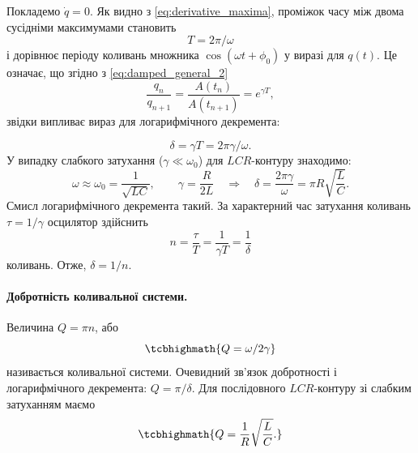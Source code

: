 Покладемо $\dot{q} = 0$. Як видно з \eqref{eq:derivative_maxima}, проміжок часу між
двома сусідніми максимумами становить
\begin{equation}\label{eq:period}
	T = 2\pi/\omega
\end{equation}
і дорівнює періоду коливань множника $\cos(\omega t + \phi_0)$ у виразі для
$q(t)$. Це означає, що згідно з \eqref{eq:damped_general_2}
\begin{equation}\label{eq:maxima_ratio}
	\frac{q_n}{q_{n+1}} = \frac{A(t_n)}{A(t_{n+1})} = e^{\gamma T},
\end{equation}
звідки випливає вираз для логарифмічного декремента:

\begin{equation}\label{eq:delta_explicit}
	\delta = \gamma T = 2\pi\gamma/\omega.
\end{equation}
У випадку слабкого затухання ($\gamma \ll \omega_0$) для $LCR$-контуру знаходимо:
\begin{equation}\label{eq:delta_weak}
	\omega \approx \omega_0 = \frac{1}{\sqrt{LC}}, \qquad
	\gamma = \frac{R}{2L}
	\quad\Rightarrow\quad
	\delta = \frac{2\pi\gamma}{\omega} = \pi R \sqrt{\frac{L}{C}}.
\end{equation}
Смисл логарифмічного декремента такий. За характерний
час затухання коливань $\tau = 1/\gamma$ осцилятор здійснить
\begin{equation}\label{eq:number_oscillations}
	n = \frac{\tau}{T} = \frac{1}{\gamma T} = \frac{1}{\delta}
\end{equation}
коливань. Отже, $\delta = 1/n$.

\paragraph*{Добротність коливальної системи.}
Величина $Q = \pi n$, або
\begin{equation}\label{eq:quality_factor}
	\tcbhighmath{
		Q = \omega/2\gamma
	}
\end{equation}
називається  коливальної системи. Очевидний зв'язок
добротності і логарифмічного декремента: $Q = \pi/\delta$. Для послідовного $LCR$-контуру зі слабким затуханням маємо
\begin{equation}\label{eq:Q_LCR}
	\tcbhighmath{
		Q = \frac{1}{R}\sqrt{\frac{L}{C}}.
	}
\end{equation}

